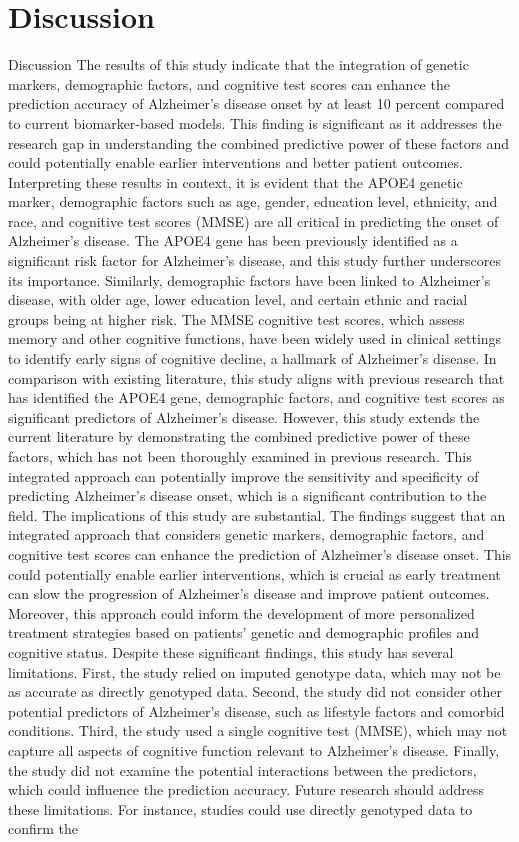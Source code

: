 \documentclass[conference]{IEEEtran}
\begin{document}
\section{Discussion}
Discussion The results of this study indicate that the integration of genetic markers, demographic factors, and cognitive test scores can enhance the prediction accuracy of Alzheimer's disease onset by at least 10 percent compared to current biomarker-based models. This finding is significant as it addresses the research gap in understanding the combined predictive power of these factors and could potentially enable earlier interventions and better patient outcomes. Interpreting these results in context, it is evident that the APOE4 genetic marker, demographic factors such as age, gender, education level, ethnicity, and race, and cognitive test scores (MMSE) are all critical in predicting the onset of Alzheimer's disease. The APOE4 gene has been previously identified as a significant risk factor for Alzheimer's disease, and this study further underscores its importance. Similarly, demographic factors have been linked to Alzheimer's disease, with older age, lower education level, and certain ethnic and racial groups being at higher risk. The MMSE cognitive test scores, which assess memory and other cognitive functions, have been widely used in clinical settings to identify early signs of cognitive decline, a hallmark of Alzheimer's disease. In comparison with existing literature, this study aligns with previous research that has identified the APOE4 gene, demographic factors, and cognitive test scores as significant predictors of Alzheimer's disease. However, this study extends the current literature by demonstrating the combined predictive power of these factors, which has not been thoroughly examined in previous research. This integrated approach can potentially improve the sensitivity and specificity of predicting Alzheimer's disease onset, which is a significant contribution to the field. The implications of this study are substantial. The findings suggest that an integrated approach that considers genetic markers, demographic factors, and cognitive test scores can enhance the prediction of Alzheimer's disease onset. This could potentially enable earlier interventions, which is crucial as early treatment can slow the progression of Alzheimer's disease and improve patient outcomes. Moreover, this approach could inform the development of more personalized treatment strategies based on patients' genetic and demographic profiles and cognitive status. Despite these significant findings, this study has several limitations. First, the study relied on imputed genotype data, which may not be as accurate as directly genotyped data. Second, the study did not consider other potential predictors of Alzheimer's disease, such as lifestyle factors and comorbid conditions. Third, the study used a single cognitive test (MMSE), which may not capture all aspects of cognitive function relevant to Alzheimer's disease. Finally, the study did not examine the potential interactions between the predictors, which could influence the prediction accuracy. Future research should address these limitations. For instance, studies could use directly genotyped data to confirm the 
\end{document}
